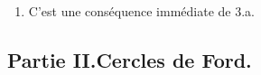 \begin{enumerate}
\begin{enumerate}
\item  D'apr{\`e}s 5.a., $\left] \frac{p}{q},\frac{p^{\prime }}{q^{\prime }}\right[ \cap \mathcal{F}_{q+q^{\prime }-1}=\emptyset $ d'apr{\`e}s 3.b. $\left] \frac{p}{q},\frac{p^{\prime }}{q^{\prime }}\right[ \cap \mathcal{F}_{q+q^{\prime }}\subset \left\{ \frac{p+p^{\prime }}{q+q^{\prime }}\right\}$ et il est {\'e}vident que $\frac{p+p^{\prime }}{q+q^{\prime }}\in \left]\frac{p}{q},\frac{p^{\prime }}{q^{\prime }}\right[ \cap \mathcal{F}_{q+q^{\prime }}$.
\end{enumerate}

\item  C'est une cons{\'e}quence imm{\'e}diate de 3.a.
\end{enumerate}

\subsection*{Partie II.\quad Cercles de Ford.}


